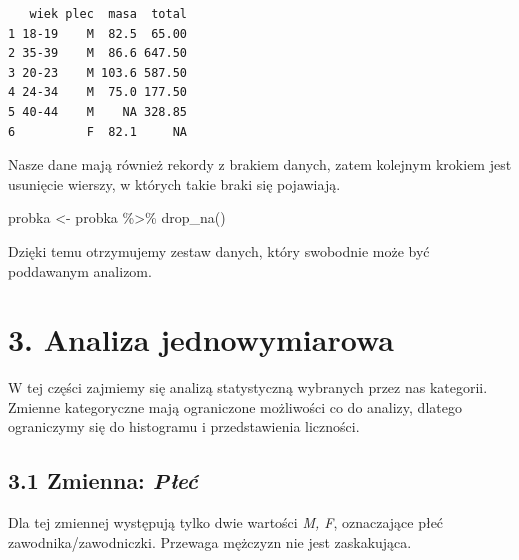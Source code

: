 \documentclass[
  letterpaper,
  DIV=11,
  numbers=noendperiod]{scrartcl}
\newenvironment{Shaded}{\begin{snugshade}}{\end{snugshade}}
\newcommand{\FunctionTok}[1]{\textcolor[rgb]{0.28,0.35,0.67}{#1}}
\newcommand{\NormalTok}[1]{\textcolor[rgb]{0.00,0.23,0.31}{#1}}
\newcommand{\OtherTok}[1]{\textcolor[rgb]{0.00,0.23,0.31}{#1}}
\newcommand{\SpecialCharTok}[1]{\textcolor[rgb]{0.37,0.37,0.37}{#1}}
\begin{document}
\begin{verbatim}
   wiek plec  masa  total
1 18-19    M  82.5  65.00
2 35-39    M  86.6 647.50
3 20-23    M 103.6 587.50
4 24-34    M  75.0 177.50
5 40-44    M    NA 328.85
6          F  82.1     NA
\end{verbatim}

Nasze dane mają również rekordy z brakiem danych, zatem kolejnym krokiem
jest usunięcie wierszy, w których takie braki się pojawiają.

\begin{Shaded}
\begin{Highlighting}[]
\NormalTok{probka }\OtherTok{\textless{}{-}}\NormalTok{ probka }\SpecialCharTok{\%\textgreater{}\%} \FunctionTok{drop\_na}\NormalTok{()}
\end{Highlighting}
\end{Shaded}

Dzięki temu otrzymujemy zestaw danych, który swobodnie może być
poddawanym analizom.

\hypertarget{analiza-jednowymiarowa}{%
\section{3. Analiza jednowymiarowa}\label{analiza-jednowymiarowa}}

W tej części zajmiemy się analizą statystyczną wybranych przez nas
kategorii. Zmienne kategoryczne mają ograniczone możliwości co do
analizy, dlatego ograniczymy się do histogramu i przedstawienia
liczności.

\hypertarget{zmienna-pux142eux107}{%
\subsection{\texorpdfstring{3.1 Zmienna:
\emph{Płeć}}{3.1 Zmienna: Płeć}}\label{zmienna-pux142eux107}}

Dla tej zmiennej występują tylko dwie wartości \emph{M, F}, oznaczające
płeć zawodnika/zawodniczki. Przewaga mężczyzn nie jest zaskakująca.
\end{document}
